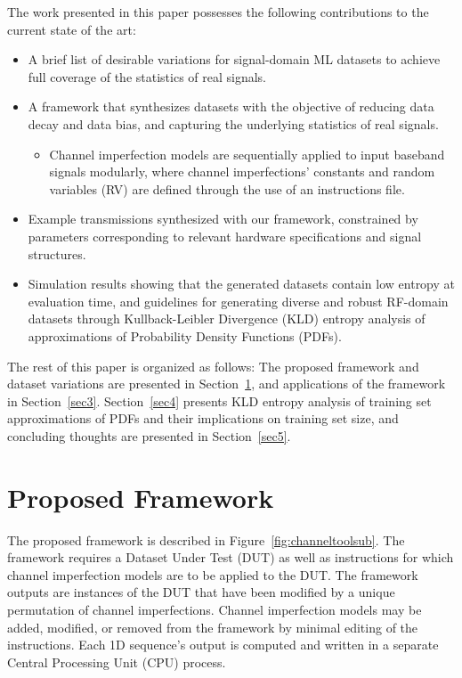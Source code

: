 The work presented in this paper possesses the following contributions to the current state of the art:
\begin{itemize}
  \item A brief list of desirable variations for signal-domain ML datasets to achieve full coverage of the statistics of real signals.
  \item A framework that synthesizes datasets with the objective of reducing data decay and data bias, and capturing the underlying statistics of real signals.
\begin{itemize}
	\item Channel imperfection models are sequentially applied to input baseband signals modularly, where channel imperfections' constants and random variables (RV) are defined through the use of an instructions file.
\end{itemize}
  \item Example transmissions synthesized with our framework, constrained by parameters corresponding to relevant hardware specifications and signal structures.
  \item Simulation results showing that the generated datasets contain low entropy at evaluation time, and guidelines for generating diverse and robust RF-domain datasets through Kullback-Leibler Divergence (KLD) entropy analysis of approximations of Probability Density Functions (PDFs).
\end{itemize}

The rest of this paper is organized as follows: The proposed framework and dataset variations are presented in Section~\ref{sec2}, and applications of the framework in Section~\ref{sec3}. Section~\ref{sec4} presents KLD entropy analysis of training set approximations of PDFs and their implications on training set size, and concluding thoughts are presented in Section~\ref{sec5}.


\section{Proposed Framework}
\label{sec2}

The proposed framework is described in Figure~\ref{fig:channeltoolsub}. The framework requires a Dataset Under Test (DUT) as well as instructions for which channel imperfection models are to be applied to the DUT. The framework outputs are instances of the DUT that have been modified by a unique permutation of channel imperfections. Channel imperfection models may be added, modified, or removed from the framework by minimal editing of the instructions. Each 1D sequence's output is computed and written in a separate Central Processing Unit (CPU) process.

